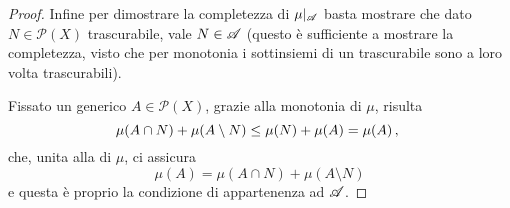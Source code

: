\begin{proof}
	Infine per dimostrare la completezza di $\mu|_{\mathscr A}$ basta mostrare che dato $N\in\mathcal P(X)$ trascurabile, vale $N\in\mathscr A$ (questo è sufficiente a mostrare la completezza, visto che per monotonia i sottinsiemi di un trascurabile sono a loro volta trascurabili).
	
	Fissato un generico $A\in\mathcal P(X)$, grazie alla monotonia di $\mu$, risulta
	\begin{equation*}
		\mu(A\cap N)+\mu(A\setminus N)\le \mu(N)+\mu(A)=\mu(A)\, \text{, }
	\end{equation*}
	che, unita alla \sigsubadd[ità] di $\mu$, ci assicura
	\begin{equation*}
		\mu(A)=\mu(A\cap N)+\mu(A\setminus N)
	\end{equation*}
	e questa è proprio la condizione di appartenenza ad $\mathscr A$.
\end{proof}

